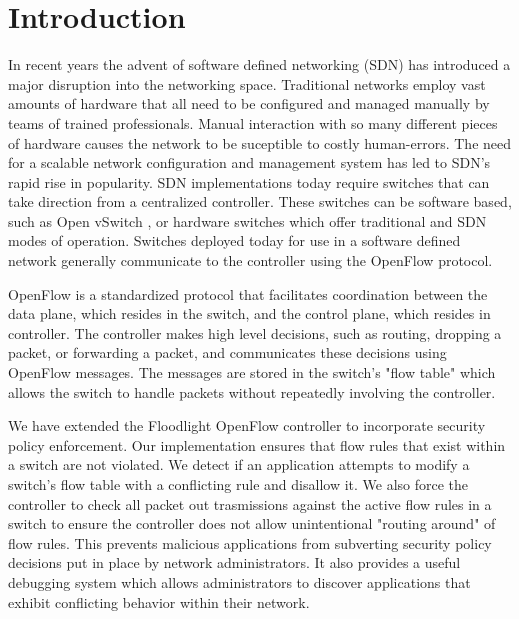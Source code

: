 \section{Introduction}
\label{sec:intro}

In recent years the advent of software defined networking (SDN) has introduced a major disruption into the networking space.
Traditional networks employ vast amounts of hardware that all need to be configured and managed manually by teams of trained professionals.
Manual interaction with so many different pieces of hardware causes the network to be suceptible to costly human-errors. 
The need for a scalable network configuration and management system has led to SDN's rapid rise in popularity.
SDN implementations today require switches that can take direction from a centralized controller.
These switches can be software based, such as Open vSwitch \cite{DBLP:conf/hotnets/PfaffPACKS09}, or hardware switches which offer traditional and SDN modes of operation.
Switches deployed today for use in a software defined network generally communicate to the controller using the OpenFlow protocol.

OpenFlow \cite{McKeown:2008:OEI:1355734.1355746} is a standardized protocol that facilitates coordination between the data plane, which resides in the switch, and the control plane, which resides in controller.
The controller makes high level decisions, such as routing, dropping a packet, or forwarding a packet, and communicates these decisions using OpenFlow messages.
The messages are stored in the switch's "flow table" which allows the switch to handle packets without repeatedly involving the controller. 


We have extended the Floodlight OpenFlow controller \cite{floodlight} to incorporate security policy enforcement.
Our implementation ensures that flow rules that exist within a switch are not violated.
We detect if an application attempts to modify a switch's flow table with a conflicting rule and disallow it.
We also force the controller to check all packet out trasmissions against the active flow rules in a switch to ensure the controller does not allow unintentional "routing around" of flow rules.
This prevents malicious applications from subverting security policy decisions put in place by network administrators.
It also provides a useful debugging system which allows administrators to discover applications that exhibit conflicting behavior within their network.

